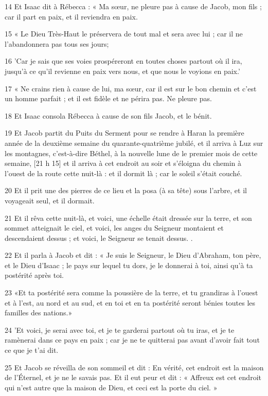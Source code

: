 \par 14 Et Isaac dit à Rébecca : « Ma sœur, ne pleure pas à cause de Jacob, mon fils ; car il part en paix, et il reviendra en paix.
\par 15 « Le Dieu Très-Haut le préservera de tout mal et sera avec lui ; car il ne l'abandonnera pas tous ses jours;
\par 16 'Car je sais que ses voies prospéreront en toutes choses partout où il ira, jusqu'à ce qu'il revienne en paix vers nous, et que nous le voyions en paix.'
\par 17 « Ne crains rien à cause de lui, ma sœur, car il est sur le bon chemin et c'est un homme parfait ; et il est fidèle et ne périra pas. Ne pleure pas.
\par 18 Et Isaac consola Rébecca à cause de son fils Jacob, et le bénit.
\par 19 Et Jacob partit du Puits du Serment pour se rendre à Haran la première année de la deuxième semaine du quarante-quatrième jubilé, et il arriva à Luz sur les montagnes, c'est-à-dire Béthel, à la nouvelle lune de le premier mois de cette semaine, [21 h 15] et il arriva à cet endroit au soir et s'éloigna du chemin à l'ouest de la route cette nuit-là : et il dormit là ; car le soleil s'était couché.
\par 20 Et il prit une des pierres de ce lieu et la posa (à sa tête) sous l'arbre, et il voyageait seul, et il dormait.
\par 21 Et il rêva cette nuit-là, et voici, une échelle était dressée sur la terre, et son sommet atteignait le ciel, et voici, les anges du Seigneur montaient et descendaient dessus ; et voici, le Seigneur se tenait dessus. .
\par 22 Et il parla à Jacob et dit : « Je suis le Seigneur, le Dieu d'Abraham, ton père, et le Dieu d'Isaac ; le pays sur lequel tu dors, je le donnerai à toi, ainsi qu'à ta postérité après toi.
\par 23 «Et ta postérité sera comme la poussière de la terre, et tu grandiras à l’ouest et à l’est, au nord et au sud, et en toi et en ta postérité seront bénies toutes les familles des nations.»
\par 24 'Et voici, je serai avec toi, et je te garderai partout où tu iras, et je te ramènerai dans ce pays en paix ; car je ne te quitterai pas avant d'avoir fait tout ce que je t'ai dit.
\par 25 Et Jacob se réveilla de son sommeil et dit : En vérité, cet endroit est la maison de l'Éternel, et je ne le savais pas. Et il eut peur et dit : « Affreux est cet endroit qui n'est autre que la maison de Dieu, et ceci est la porte du ciel. »
